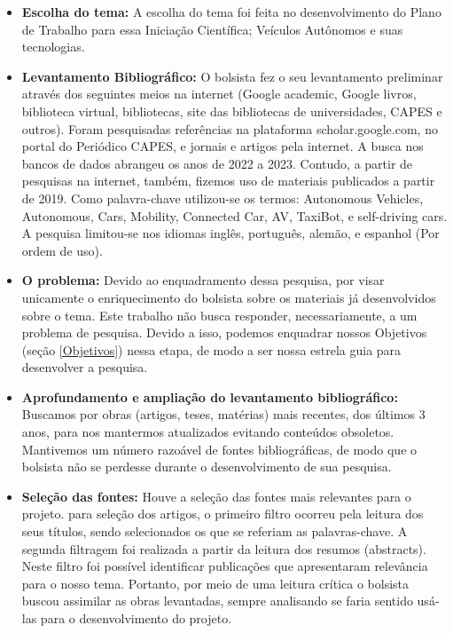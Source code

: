 \begin{itemize}

\item \textbf{Escolha do tema:} A escolha do tema foi feita no desenvolvimento do Plano de Trabalho para essa Iniciação Científica; Veículos Autônomos e suas tecnologias. 

\item \textbf{Levantamento Bibliográfico:} O bolsista fez o seu levantamento preliminar através dos seguintes meios na internet (Google academic, Google livros, biblioteca virtual, bibliotecas, site das bibliotecas de universidades, CAPES e outros). Foram pesquisadas referências na plataforma scholar.google.com, no portal do Periódico CAPES, e jornais e artigos pela internet. A busca nos bancos de dados abrangeu os anos de 2022 a 2023. Contudo, a partir de pesquisas na internet, também, fizemos uso de materiais publicados a partir de 2019. Como palavra-chave utilizou-se os termos: Autonomous Vehicles, Autonomous, Cars, Mobility, Connected Car, AV, TaxiBot, e self-driving cars.  A pesquisa limitou-se nos idiomas inglês, português,  alemão, e espanhol (Por ordem de uso).


\item \textbf{O problema:} Devido ao enquadramento dessa pesquisa, por visar unicamente o enriquecimento do bolsista sobre os materiais já desenvolvidos sobre o tema. Este trabalho não busca responder, necessariamente, a um problema de pesquisa. Devido a isso, podemos enquadrar nossos Objetivos (seção \ref{Objetivos}) nessa etapa, de modo a ser nossa estrela guia para desenvolver a pesquisa.

\item \textbf{Aprofundamento e ampliação do levantamento bibliográfico:} Buscamos por obras (artigos, teses, matérias) mais recentes, dos últimos 3 anos, para nos mantermos atualizados evitando conteúdos obsoletos. Mantivemos um número razoável de fontes bibliográficas, de modo que o bolsista não se perdesse durante o desenvolvimento de sua pesquisa. 

\item \textbf{Seleção das fontes:} Houve a seleção das fontes mais relevantes para o projeto. para seleção dos artigos, o primeiro filtro ocorreu pela leitura dos seus títulos, sendo selecionados os que se referiam as palavras-chave. A segunda filtragem foi realizada a partir da leitura dos resumos (abstracts). Neste filtro foi possível identificar publicações que apresentaram relevância para o nosso tema.
Portanto, por meio de uma leitura crítica o bolsista buscou assimilar as obras levantadas, sempre analisando se faria sentido usá-las para o desenvolvimento do projeto. 


\end{itemize}
